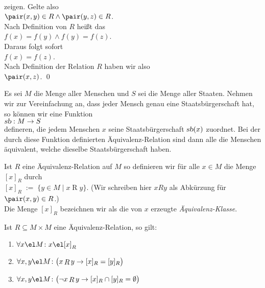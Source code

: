 \begin{enumerate}
      \\[0.2cm]
      zeigen.  Gelte also 
      \\[0.2cm]
      \hspace*{1.3cm}
      $\pair(x,y) \in R \wedge \pair(y,z) \in R$.
      \\[0.2cm]
      Nach Definition von $R$ heißt das 
      \\[0.2cm]
      \hspace*{1.3cm}
      $f(x) = f(y) \wedge f(y) = f(z)$.
      \\[0.2cm]
      Daraus folgt sofort 
      \\[0.2cm]
      \hspace*{1.3cm}
      $f(x) = f(z)$.
      \\[0.2cm]
      Nach Definition der Relation $R$ haben wir also 
      \\[0.2cm]
      \hspace*{1.3cm}
      $\pair(x,z)$.  \qed
\end{enumerate}

\example
Es sei $M$ die Menge aller Menschen und $S$ sei die Menge aller Staaten.  Nehmen wir zur
Vereinfachung an, dass jeder Mensch genau eine Staatsbürgerschaft hat, so können wir eine Funktion
\\[0.2cm]
\hspace*{1.3cm}
$\textsl{sb}: M \rightarrow S$
\\[0.2cm]
defineren, die jedem Menschen $x$ seine Staatsbürgerschaft $\textsl{sb}(x)$ zuordnet.  Bei der durch
diese Funktion definierten Äquivalenz-Relation sind dann alle die Menschen äquivalent, welche dieselbe
Staatsbürgerschaft haben.  


\begin{Definition}
Ist $R$ eine Äquivalenz-Relation auf $M$ so definieren wir für alle $x \in M$ 
die Menge $[x]_R$ durch \\[0.2cm]
\hspace*{1.3cm} $[x]_R \;:=\; \bigl\{ y \in M \mid x \mathop{R} y \bigr\}$. \qquad
(Wir schreiben hier $x R y$ als Abkürzung für $\pair(x, y) \in R$.) 
\\[0.2cm]
Die Menge $[x]_R$ bezeichnen wir als die von $x$ erzeugte \emph{Äquivalenz-Klasse}.  
\end{Definition}

\begin{Satz} 
Ist $R \subseteq M \times M$ eine Äquivalenz-Relation, so gilt: 
\begin{enumerate}
\item $\forall x \el M \colon x \el [x]_R$
\item $\forall x, y \el M \colon \bigl(x \mathop{R} y \rightarrow [x]_R = [y]_R\bigr)$
\item $\forall x, y \el M \colon \bigl(\neg x \mathop{R} y \rightarrow [x]_R \cap [y]_R = \emptyset\bigr)$
\end{enumerate}
\end{Satz}

